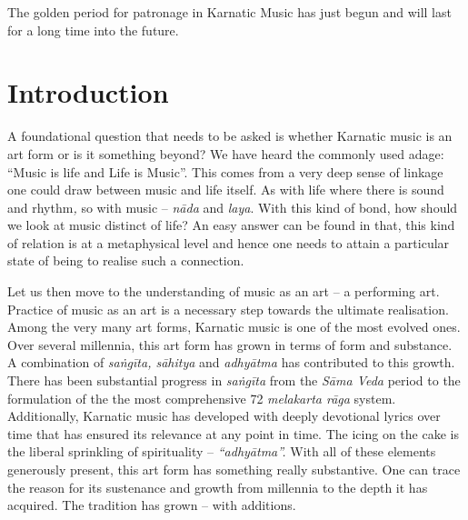 The golden period for patronage in Karnatic Music has just begun and will last for a long time into the future.


\section*{Introduction}


A foundational question that needs to be asked is whether Karnatic music is an art form or is it something beyond? We have heard the commonly used adage: “Music is life and Life is Music”. This comes from a very deep sense of linkage one could draw between music and life itself. As with life where there is sound and rhythm\textit{,} so with music – \textit{nāda} and \textit{laya}. With this kind of bond, how should we look at music distinct of life? An easy answer can be found in that, this kind of relation is at a metaphysical level and hence one needs to attain a particular state of being to realise such a connection.

\vspace{-.07cm}

Let us then move to the understanding of music as an art – a performing art. Practice of music as an art is a necessary step towards the ultimate realisation. Among the very many art forms, Karnatic music is one of the most evolved ones. Over several millennia, this art form has grown in terms of form and substance. A combination of \textit{saṅgīta, sāhitya} and \textit{adhyātma} has contributed to this growth. There has been substantial progress in \textit{saṅgīta} from the \textit{Sāma Veda} period to the formulation of the the most comprehensive 72 \textit{melakarta rāga} system. Additionally, Karnatic music has developed with deeply devotional lyrics over time that has ensured its relevance at any point in time. The icing on the cake is the liberal sprinkling of spirituality – \textit{“adhyātma”.} With all of these elements generously present, this art form has something really substantive. One can trace the reason for its sustenance and growth from millennia to the depth it has acquired. The tradition has grown – with additions.

